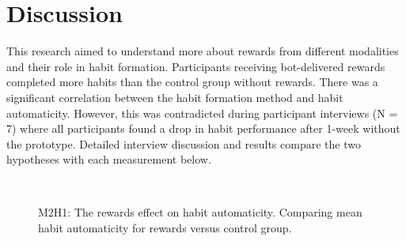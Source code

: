 \section{Discussion}
This research aimed to understand more about rewards from different modalities and their role in habit formation. Participants receiving bot-delivered rewards completed more habits than the control group without rewards. There was a significant correlation between the habit formation method and habit automaticity. However, this was contradicted during participant interviews (N = 7) where all participants found a drop in habit performance after 1-week without the prototype. Detailed interview discussion and results compare the two hypotheses with each measurement below.





\begin{figure}
  \centering
  \caption{M2H1: The rewards effect on habit automaticity. Comparing mean habit automaticity for rewards versus control group.}~\label{fig:m2_h1}
\end{figure}



